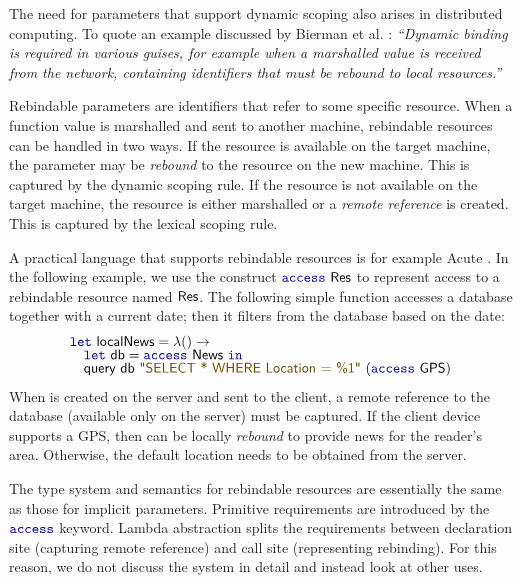 The need for parameters that support dynamic scoping also arises in distributed computing.
To quote an example discussed by Bierman et al. \cite{app-distributed-rebinding}: \emph{``Dynamic
binding is required in various guises, for example when a marshalled value is received from the
network, containing identifiers that must be rebound to local resources.''}

Rebindable parameters are identifiers that refer to some specific resource. When a function value
is marshalled and sent to another machine, rebindable resources can be handled in two ways.
If the resource is available on the target machine, the parameter may be \emph{rebound} to
the resource on the new machine. This is captured by the dynamic scoping rule. If the
resource is not available on the target machine, the resource is either marshalled or a \emph{remote
reference} is created. This is captured by the lexical scoping rule.

A practical language that supports rebindable resources is for example Acute \cite{app-distributed-acute}.
In the following example, we use the construct $\kvd{access}~\ident{Res}$ to represent
access to a rebindable resource named $\textnormal{\sffamily Res}$. The following simple function accesses
a database together with a current date; then it filters from the database based on the date:
%
\begin{equation*}
\begin{array}{l}
 \kvd{let}~\ident{localNews} = \lambda () \rightarrow\\[-0.25em]
 \quad\kvd{let}~\ident{db} = \kvd{access}~\ident{News}~\kvd{in}\\[-0.25em]
 \quad\ident{query}~\ident{db}~\str{SELECT * WHERE Location = \%1}~(\kvd{access}~\ident{GPS})
\end{array}
\end{equation*}
%
When  is created on the server and sent to the client, a remote reference to
the database (available only on the server) must be captured. If the client device supports a
GPS, then  can be locally \emph{rebound} to provide news for the reader's area.
Otherwise, the default location needs to be obtained from the server.

The type system and semantics for rebindable resources are essentially the same as those for
implicit parameters. Primitive requirements are introduced by the $\kvd{access}$ keyword.
Lambda abstraction splits the requirements between declaration site (capturing remote reference)
and call site (representing rebinding). For this reason, we do not discuss the system in detail
and instead look at other uses.

